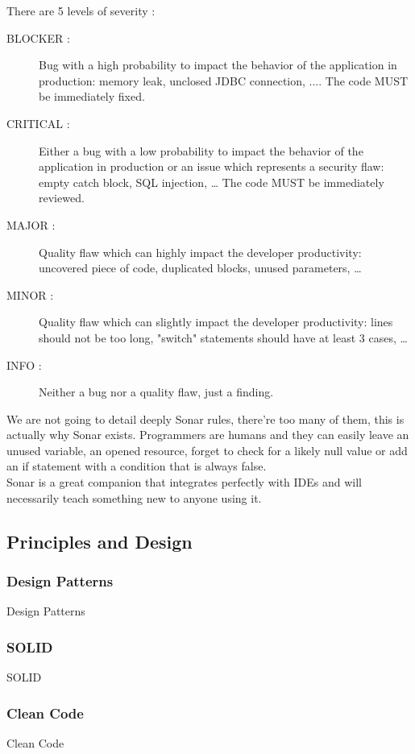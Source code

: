 There are 5 levels of severity :

\begin{description}
    \item[BLOCKER :]
Bug with a high probability to impact the behavior of the application
in production: memory leak, unclosed JDBC connection, ....
The code MUST be immediately fixed.
    \item[CRITICAL :]
Either a bug with a low probability to impact the behavior of the
application in production or an issue which represents a
security flaw: empty catch block, SQL injection, \ldots
The code MUST be immediately reviewed.
    \item[MAJOR :]
Quality flaw which can highly impact the developer productivity:
uncovered piece of code, duplicated blocks, unused parameters,
    \ldots
    \item[MINOR :]
Quality flaw which can slightly impact the developer productivity:
lines should not be too long, "switch" statements should have at
least 3 cases, \ldots
    \item[INFO :]
Neither a bug nor a quality flaw, just a finding.
\end{description}

We are not going to detail deeply Sonar rules, there're too many of them,
this is actually why Sonar exists.
Programmers are humans and they can easily leave an unused variable, an
opened resource, forget to check for a likely null value or add an if
statement with a condition that is always false. \\
Sonar is a great companion that integrates perfectly with IDEs and will
necessarily teach something new to anyone using it.

\subsection{Principles and Design}\label{subsec:principles}

\subsubsection{Design Patterns}
Design Patterns

\subsubsection{SOLID}
SOLID

\subsubsection{Clean Code}
Clean Code

